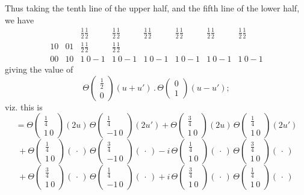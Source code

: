 \documentclass[11pt]{article}
\begin{document}
\noindent Thus taking the tenth line of the upper half, and the fifth line of the lower half, we have
\[
\begin{array}{c|c|cccccc}
& & \tfrac{1}{2}\tfrac{1}{2} & \tfrac{1}{2}\tfrac{1}{2} & \tfrac{1}{2}\tfrac{1}{2} & \tfrac{1}{2}\tfrac{1}{2} & \tfrac{1}{2}\tfrac{1}{2} & \tfrac{1}{2}\tfrac{1}{2}\\
10 & 01 & \tfrac{1}{2}\tfrac{1}{2} & \tfrac{1}{2}\tfrac{1}{2} & & & & \\
\hline
00 & 10 & 1\ 0{-}1 & 1\ 0{-}1 & 1\ 0{-}1 & 1\ 0{-}1 & 1\ 0{-}1 & 1\ 0{-}1
\end{array}
\]
giving the value of
\[
\Theta\!\begin{pmatrix}\tfrac{1}{2}\\ 0\end{pmatrix}(u+u')\,.\,\Theta\!\begin{pmatrix}0\\ 1\end{pmatrix}(u-u');
\]
viz. this is
\[
= \Theta\!\begin{pmatrix}\tfrac{1}{4}\\ 1\,0\end{pmatrix}(2u)\,\Theta\!\begin{pmatrix}\tfrac{1}{4}\\ -1\,0\end{pmatrix}(2u') + \Theta\!\begin{pmatrix}\tfrac{3}{4}\\ 1\,0\end{pmatrix}(2u)\,\Theta\!\begin{pmatrix}\tfrac{1}{4}\\ 1\,0\end{pmatrix}(2u')
\]
\[
+\ \Theta\!\begin{pmatrix}\tfrac{1}{4}\\ 1\,0\end{pmatrix}(\,\cdot\,)\,\Theta\!\begin{pmatrix}\tfrac{3}{4}\\ -1\,0\end{pmatrix}(\,\cdot\,) - i\,\Theta\!\begin{pmatrix}\tfrac{1}{4}\\ 1\,0\end{pmatrix}(\,\cdot\,)\,\Theta\!\begin{pmatrix}\tfrac{3}{4}\\ 1\,0\end{pmatrix}(\,\cdot\,)
\]
\[
+\ \Theta\!\begin{pmatrix}\tfrac{3}{4}\\ 1\,0\end{pmatrix}(\,\cdot\,)\,\Theta\!\begin{pmatrix}\tfrac{1}{4}\\ -1\,0\end{pmatrix}(\,\cdot\,) + i\,\Theta\!\begin{pmatrix}\tfrac{3}{4}\\ 1\,0\end{pmatrix}(\,\cdot\,)\,\Theta\!\begin{pmatrix}\tfrac{1}{4}\\ 1\,0\end{pmatrix}(\,\cdot\,)
\]
\end{document}
